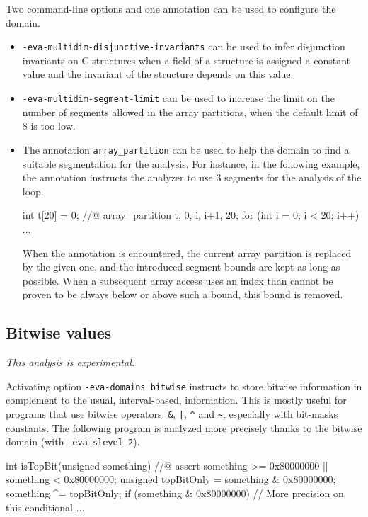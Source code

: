 \documentclass{frama-c-book}
\begin{document}
Two command-line options and one annotation can be used to configure the
domain.
\begin{itemize}
  \item {\tt -eva-multidim-disjunctive-invariants} can be used to infer
        disjunction invariants on C structures when a field of a structure is
        assigned a constant value and the invariant of the structure depends on
        this value.
  \item {\tt -eva-multidim-segment-limit} can be used to increase the limit on
        the number of segments allowed in the array partitions, when the default
        limit of 8 is too low.
  \item The annotation {\tt array\_partition} can be used to help the domain
        to find a suitable segmentation for the analysis. For instance, in
        the following example, the annotation instructs the analyzer to use
        3 segments for the analysis of the loop.
\begin{listing-nonumber}
int t[20] = {0};
//@ array_partition t, 0, i, i+1, 20;
for (int i = 0; i < 20; i++) {
  ...
}
\end{listing-nonumber}
        When the annotation is encountered, the current array partition is
        replaced by the given one, and the introduced segment bounds are kept
        as long as possible. When a subsequent array access uses an index than
        cannot be proven to be always below or above such a bound, this
        bound is removed.
\end{itemize}


\subsection{Bitwise values}
\label{sec:bitwise}

\emph{This analysis is experimental.}

Activating option \texttt{-eva-domains bitwise} instructs \Eva{} to store
bitwise information in complement to the usual, interval-based, information.
This is mostly useful for programs that use bitwise operators: \verb+&+,
\verb+|+, \verb+^+ and \verb+~+, especially with bit-masks constants.
The following program is analyzed more precisely thanks to the bitwise
domain (with \lstinline+-eva-slevel 2+).
\begin{listing-nonumber}
int isTopBit(unsigned something)
{
  //@ assert something >= 0x80000000 || something < 0x80000000;
  unsigned topBitOnly = something & 0x80000000;
  something ^= topBitOnly;
  if (something & 0x80000000) // More precision on this conditional { ... }
}
\end{listing-nonumber}
\end{document}
